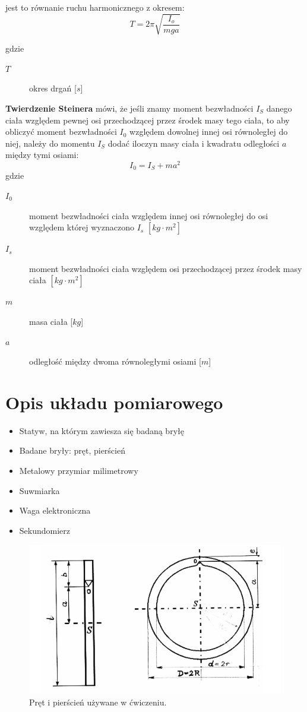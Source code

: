 \documentclass[a4paper,11pt]{article}
\begin{document}
jest to równanie ruchu harmonicznego z okresem:
\begin{equation}
T=2\pi\sqrt{\frac{I_{o}}{mga}}
\end{equation}

gdzie 
\begin{description}
\item [$T$] okres drgań [$s$]
\end{description}

\textbf{Twierdzenie Steinera} mówi, że jeśli znamy moment bezwładności $I_{S}$ danego ciała względem pewnej osi przechodzącej przez środek masy tego ciała, to aby obliczyć moment bezwładności $I_{0}$ względem dowolnej innej osi równoległej do niej, należy do momentu $I_{S}$ dodać iloczyn masy ciała i kwadratu odległości $a$ między tymi osiami:
\begin{equation}
I_{0}=I_{S}+ma^{2}
\end{equation}
gdzie
\begin{description}
\item [$I_{0}$] moment bezwładności ciała względem innej osi równoległej do osi względem której wyznaczono $I_{s}$ $\left[ kg \cdot m^{2} \right]$
\item [$I_{s}$] moment bezwładności ciała względem osi przechodzącej przez środek masy ciała $\left[ kg \cdot m^{2}\right]$
\item [$m$] masa ciała [$kg$]
\item [$a$] odległość między dwoma równoległymi osiami [$m$]
\end{description}

\section{Opis układu pomiarowego}

\begin{itemize}
\item Statyw, na którym zawiesza się badaną bryłę
\item Badane bryły: pręt, pierścień
\item Metalowy przymiar milimetrowy
\item Suwmiarka
\item Waga elektroniczna
\item Sekundomierz
\end{itemize}

\begin{figure}[ht]
\caption{Pręt i pierścień używane w ćwiczeniu.}
\label{rys:1}
\centering
\includegraphics[width=0.7\linewidth]{./schemat}
\end{figure}
\end{document}
